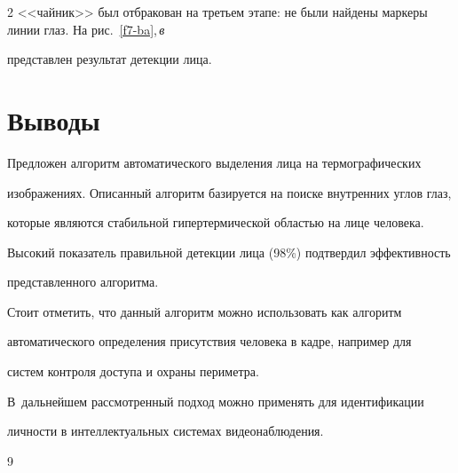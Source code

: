 \begin{multicols}{2}
<<чайник>> был отбракован на третьем этапе: не были найдены маркеры линии глаз. На рис.~\ref{f7-ba},\,\textit{в} 


представлен результат детекции лица.





\vspace*{-6pt}





\section{Выводы}





  Предложен алгоритм автоматического выделения лица на термографических 


изображениях. Описанный алгоритм базируется на поиске внут\-рен\-них углов глаз, 


которые являются стабильной гипертермической областью на лице человека. 


Высокий показатель правильной детекции лица (98\%) подтвердил эффективность 


представленного алгоритма.


  


  Стоит отметить, что данный алгоритм можно использовать как алгоритм 


автоматического определения присутствия человека в кадре, например для 


систем контроля доступа и охраны периметра.


  


  В~дальнейшем рассмотренный подход можно применять для идентификации 


личности в интеллектуальных системах видеонаблюдения.





\vspace*{-6pt}





{\small\frenchspacing


{%




\begin{thebibliography}{9}






\end{thebibliography}}}
\end{multicols}
